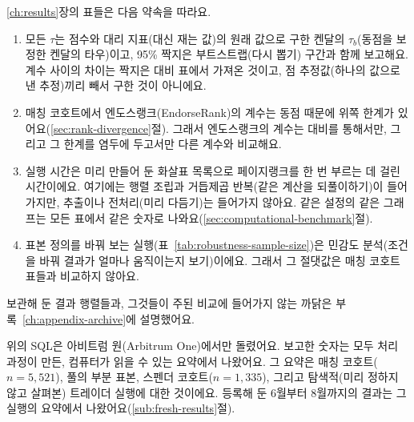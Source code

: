 
\ref{ch:results}장의 표들은 다음 약속을 따라요.

\begin{enumerate}
\item 모든 $\tau$는 점수와 대리 지표(대신 재는 값)의 원래 값으로 구한 켄달의 $\tau_b$(동점을 보정한 켄달의 타우)이고, 95\% 짝지은 부트스트랩(다시 뽑기) 구간과 함께 보고해요. 계수 사이의 차이는 짝지은 대비 표에서 가져온 것이고, 점 추정값(하나의 값으로 낸 추정)끼리 빼서 구한 것이 아니에요.
\item 매칭 코호트에서 엔도스랭크(EndorseRank)의 계수는 동점 때문에 위쪽 한계가 있어요(\ref{sec:rank-divergence}절). 그래서 엔도스랭크의 계수는 대비를 통해서만, 그리고 그 한계를 염두에 두고서만 다른 계수와 비교해요.
\item 실행 시간은 미리 만들어 둔 화살표 목록으로 페이지랭크를 한 번 부르는 데 걸린 시간이에요. 여기에는 행렬 조립과 거듭제곱 반복(같은 계산을 되풀이하기)이 들어가지만, 추출이나 전처리(미리 다듬기)는 들어가지 않아요. 같은 설정의 같은 그래프는 모든 표에서 같은 숫자로 나와요(\ref{sec:computational-benchmark}절).
\item 표본 정의를 바꿔 보는 실행(표~\ref{tab:robustness-sample-size})은 민감도 분석(조건을 바꿔 결과가 얼마나 움직이는지 보기)이에요. 그래서 그 절댓값은 매칭 코호트 표들과 비교하지 않아요.
\end{enumerate}


보관해 둔 결과 행렬들과, 그것들이 주된 비교에 들어가지 않는 까닭은 부록~\ref{ch:appendix-archive}에 설명했어요.


위의 SQL은 아비트럼 원(Arbitrum One)에서만 돌렸어요. 보고한 숫자는 모두 처리 과정이 만든, 컴퓨터가 읽을 수 있는 요약에서 나왔어요. 그 요약은 매칭 코호트($n=5{,}521$), 풀의 부분 표본, 스펜더 코호트($n=1{,}335$), 그리고 탐색적(미리 정하지 않고 살펴본) 트레이더 실행에 대한 것이에요. 등록해 둔 6월부터 8월까지의 결과는 그 실행의 요약에서 나왔어요(\ref{sub:fresh-results}절).
